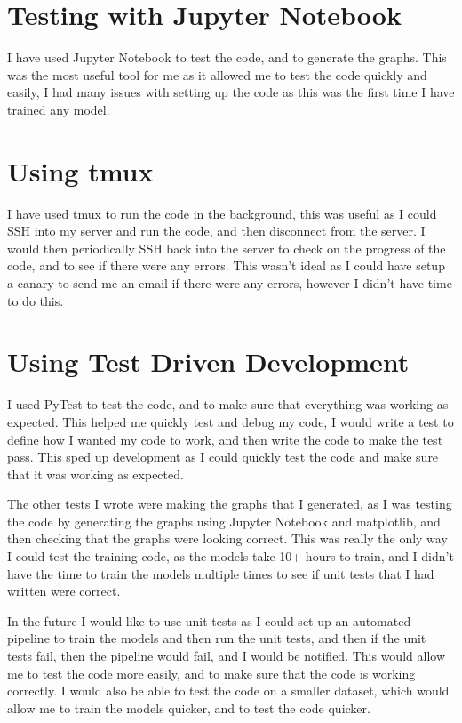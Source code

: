 \documentclass[]{final_report}
\begin{document}
\section{Testing with Jupyter Notebook}
I have used Jupyter Notebook to test the code, and to generate the graphs.
This was the most useful tool for me as it allowed me to test the code quickly and easily,
I had many issues with setting up the code as this was the first time I have trained any model.

\section{Using tmux}
I have used tmux to run the code in the background, this was useful as I could SSH into my server and run the code, and then disconnect from the server.
I would then periodically SSH back into the server to check on the progress of the code, and to see if there were any errors.
This wasn't ideal as I could have setup a canary to send me an email if there were any errors, however I didn't have time to do this.

\section{Using Test Driven Development}
I used PyTest\cite{PyTest} to test the code, and to make sure that everything was working as expected.
This helped me quickly test and debug my code, I would write a test to define how I wanted my code to work, and then write the code to make the test pass.
This sped up development as I could quickly test the code and make sure that it was working as expected.

The other tests I wrote were making the graphs that I generated, as I was testing the code by generating the graphs using Jupyter Notebook\cite{Jupyter} and matplotlib\cite{Matplotlib},
and then checking that the graphs were looking correct. This was really the only way I could test the training code, as the models take 10+ hours to train,
and I didn't have the time to train the models multiple times to see if unit tests that I had written were correct.

In the future I would like to use unit tests as I could set up an automated pipeline to train the models and then run the unit tests,
and then if the unit tests fail, then the pipeline would fail, and I would be notified. This would allow me to test the code more easily,
and to make sure that the code is working correctly. I would also be able to test the code on a smaller dataset, which would allow me to train the models quicker,
and to test the code quicker.
\end{document}
